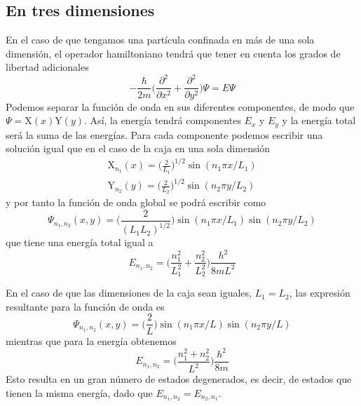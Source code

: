 \subsection{En tres dimensiones}
En el caso de que tengamos una partícula confinada
en más de una sola dimensión, el operador 
hamiltoniano tendrá que tener en cuenta los 
grados de libertad adicionales
\begin{equation}
    -\frac{\hbar}{2m}\bigg(\frac{\partial^2}{\partial x^2} + \frac{\partial^2}{\partial y^2}\bigg)\Psi= E\Psi
\end{equation}
Podemos separar la función de onda en sus diferentes
componentes, de modo que $\Psi=\mathrm{X}(x)\mathrm{Y}(y)$. Así, la 
energía tendrá componentes $E_x$ y $E_y$ y la
energía total será la suma de las energías.
Para cada componente podemos escribir una
solución igual que en el caso de la caja
en una sola dimensión
\begin{subequations}
    \begin{align}
        \mathrm{X}_{n_1}(x)=\bigg(\frac{2}{L_1}\bigg)^{1/2}\sin(n_1\pi x/L_1) \\
        \mathrm{Y}_{n_2}(y)=\bigg(\frac{2}{L_2}\bigg)^{1/2}\sin(n_2\pi y/L_2)
    \end{align}
\end{subequations}
y por tanto la función de onda global se podrá
escribir como
\begin{equation}
        \Psi_{n_1, n_2}(x,y)=\bigg(\frac{2}{(L_1L_2)^{1/2}}\bigg)\sin(n_1\pi x/L_1)\sin(n_2\pi y/L_2)
\end{equation}
que tiene una energía total igual a
\begin{equation}
    E_{n_1,n_2} =\bigg(\frac{n_1^2}{L_1^2} + \frac{n_2^2}{L_2^2}\bigg)\frac{h^2}{8mL^2}
\end{equation}

En el caso de que las dimensiones de la caja
sean iguales, $L_1=L_2$, las expresión resultante
para la función de onda es
\begin{equation}
    \Psi_{n_1, n_2}(x,y)=\bigg(\frac{2}{L}\bigg)\sin(n_1\pi x/L)\sin(n_2\pi y/L)
\end{equation}
mientras que para la energía obtenemos
\begin{equation}
    E_{n_1,n_2}=\bigg(\frac{n_1^2+n_2^2}{L^2}\bigg)\frac{h^2}{8m}
\end{equation}
Esto resulta en un gran número de estados degenerados, 
es decir, de estados que tienen la misma energía,
dado que $E_{n_1,n_2}=E_{n_2,n_1}$.


